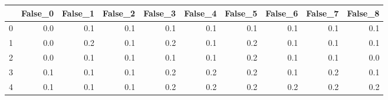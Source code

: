 \begin{tabular}{lrrrrrrrrr}
\toprule
{} &  False\_0 &  False\_1 &  False\_2 &  False\_3 &  False\_4 &  False\_5 &  False\_6 &  False\_7 &  False\_8 \\ \hline
\midrule
0 &      0.0 &      0.1 &      0.1 &      0.1 &      0.1 &      0.1 &      0.1 &      0.1 &      0.1 \\ \hline
1 &      0.0 &      0.2 &      0.1 &      0.2 &      0.1 &      0.2 &      0.1 &      0.1 &      0.1 \\ \hline
2 &      0.0 &      0.1 &      0.1 &      0.1 &      0.1 &      0.2 &      0.1 &      0.1 &      0.0 \\ \hline
3 &      0.1 &      0.1 &      0.1 &      0.2 &      0.2 &      0.2 &      0.1 &      0.2 &      0.1 \\ \hline
4 &      0.1 &      0.1 &      0.1 &      0.2 &      0.2 &      0.2 &      0.2 &      0.2 &      0.2 \\ \hline
\bottomrule
\end{tabular}
